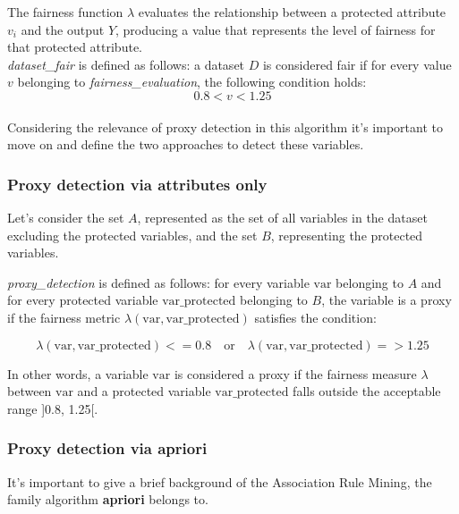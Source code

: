 \documentclass[12pt,a4paper,openright,twoside]{book}
\begin{document}
The fairness function \( \lambda \) evaluates the relationship between a protected attribute \( v_i \) and the output \( Y \), producing a value that represents the level of fairness for that protected attribute. \\

\textit{dataset\_fair} is defined as follows: a dataset \( D \) is considered fair if for every value \( v \) belonging to \textit{fairness\_evaluation}, the following condition holds:
\[ 0.8  < v < 1.25 \] \\

Considering the relevance of proxy detection in this algorithm it's important to move on and define the two approaches to detect these variables. \\

\subsubsection{Proxy detection via attributes only}
Let's consider the set \( A \), represented as the set of all variables in the dataset excluding the protected variables, and the set \( B \), representing the protected variables.

\textit{proxy\_detection} is defined as follows: for every variable \( \text{var} \) belonging to \( A \) and for every protected variable \( \text{var\_protected} \) belonging to \( B \), the variable is a proxy if the fairness metric \( \lambda(\text{var}, \text{var\_protected}) \) satisfies the condition:

\[
\lambda(\text{var}, \text{var\_protected}) <= 0.8 \quad \text{or} \quad \lambda(\text{var}, \text{var\_protected}) => 1.25
\]

In other words, a variable \( \text{var} \) is considered a proxy if the fairness measure \( \lambda \) between \( \text{var} \) and a protected variable \( \text{var\_protected} \) falls outside the acceptable range ]0.8, 1.25[. \\

\subsubsection{Proxy detection via apriori}
It's important to give a brief background of the Association Rule Mining, the family algorithm \textbf{apriori} belongs to.
\end{document}
